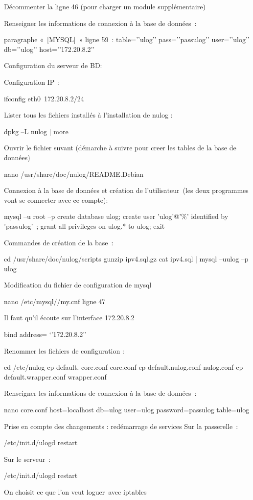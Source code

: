 \documentclass[12pt]{report}
\begin{document}
\begin{itemize}
Décommenter la ligne 46 (pour charger un module supplémentaire)

Renseigner les informations de connexion à la base de données :

paragraphe « [MYSQL] » ligne 59 :
table=’’ulog’’
pass=’’passulog’’
user=’’ulog’’
db=’’ulog’’
host=’’172.20.8.2’’

Configuration du serveur de BD:

Configuration IP :

ifconfig eth0 172.20.8.2/24

Lister tous les fichiers installés à l’installation de nulog :

dpkg –L nulog | more

Ouvrir le fichier suvant (démarche à suivre pour creer les tables de la base de données)

nano /usr/share/doc/nulog/README.Debian

Connexion à la base de données et création de l’utilisateur (les deux programmes vont se connecter avec ce compte):

mysql –u root –p
create database ulog;
create user 'ulog'@'\%' identified by 'passulog' ;
grant all privileges on ulog.* to ulog;
exit

Commandes de création de la base :

cd /usr/share/doc/nulog/scripts
gunzip ipv4.sql.gz
cat ipv4.sql | mysql –uulog –p ulog

Modification du fichier de configuration de mysql

nano /etc/mysql//my.cnf
ligne 47

Il faut qu’il écoute sur l’interface 172.20.8.2

bind address= ‘’172.20.8.2’’

Renommer les fichiers de configuration :

cd /etc/nulog
cp default. core.conf core.conf
cp default.nulog.conf nulog.conf
cp default.wrapper.conf wrapper.conf

Renseigner les informations de connexion à la base de données :

nano core.conf
host=localhost
db=ulog
user=ulog
password=passulog
table=ulog

Prise en compte des changements : redémarrage de services
Sur la passerelle :

/etc/init.d/ulogd restart

Sur le serveur :

/etc/init.d/ulogd restart


On choisit ce que l’on veut loguer avec iptables


\end{itemize}
\end{document}
